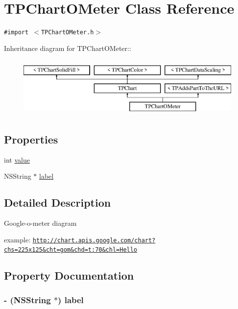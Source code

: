 \hypertarget{interface_t_p_chart_o_meter}{
\section{TPChartOMeter Class Reference}
\label{interface_t_p_chart_o_meter}
}
{\tt \#import $<$TPChartOMeter.h$>$}

Inheritance diagram for TPChartOMeter::\begin{figure}[H]
\begin{center}
\leavevmode
\includegraphics[height=3cm]{interface_t_p_chart_o_meter}
\end{center}
\end{figure}
\subsection*{Properties}
\begin{CompactItemize}
\item 
int \hyperlink{interface_t_p_chart_o_meter_f28c79861d8123f6294791942243c0aa}{value}
\item 
NSString $\ast$ \hyperlink{interface_t_p_chart_o_meter_13fa16f1efed823bb7dc221355688312}{label}
\end{CompactItemize}


\subsection{Detailed Description}
Google-o-meter diagram\par
 example: \href{http://chart.apis.google.com/chart?chs=225x125&cht=gom&chd=t:70&chl=Hello}{\tt http://chart.apis.google.com/chart?chs=225x125\&cht=gom\&chd=t:70\&chl=Hello} 

\subsection{Property Documentation}
\hypertarget{interface_t_p_chart_o_meter_13fa16f1efed823bb7dc221355688312}{
\subsubsection[{label}]{\setlength{\rightskip}{0pt plus 5cm}- (NSString $\ast$) label}}
\label{interface_t_p_chart_o_meter_13fa16f1efed823bb7dc221355688312}



